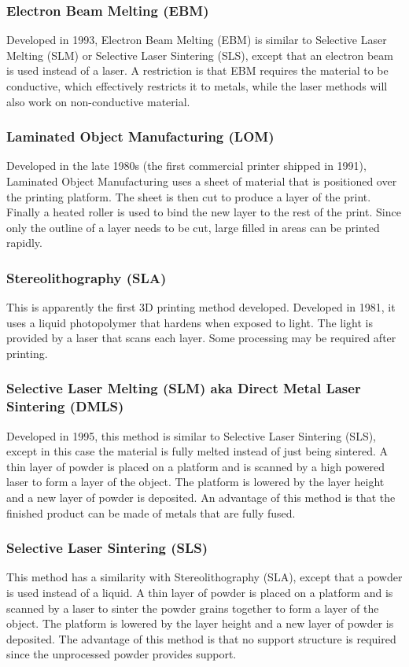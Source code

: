 \documentclass[english,10pt]{beamer}
\begin{document}
\begin{frame}
  \frametitle{Electron Beam Melting (EBM)}
  Developed in 1993, Electron Beam Melting (EBM) is similar to Selective Laser Melting (SLM) or Selective Laser Sintering (SLS), except that an electron beam is used instead of a laser.  A restriction is that EBM requires the material to be conductive, which effectively restricts it to metals, while the laser methods will also work on non-conductive material.
\end{frame}

\begin{frame}
  \frametitle{Laminated Object Manufacturing (LOM)}
  Developed in the late 1980s (the first commercial printer shipped in 1991), Laminated Object Manufacturing uses a sheet of material that is positioned over the printing platform.  The sheet is then cut to produce a layer of the print.  Finally a heated roller is used to bind the new layer to the rest of the print.  Since only the outline of a layer needs to be cut, large filled in areas can be printed rapidly.
\end{frame}

\begin{frame}
  \frametitle{Stereolithography (SLA)}
  This is apparently the first 3D printing method developed.  Developed in 1981, it uses a liquid photopolymer that hardens when exposed to light.  The light is provided by a laser that scans each layer.  Some processing may be required after printing.
\end{frame}

\begin{frame}
  \frametitle{Selective Laser Melting (SLM) aka Direct Metal Laser Sintering (DMLS)}
  Developed in 1995, this method is similar to Selective Laser Sintering (SLS), except in this case the material is fully melted instead of just being sintered.    A thin layer of powder is placed on a platform and is scanned by a high powered laser to form a layer of the object.  The platform is lowered by the layer height and a new layer of powder is deposited.  An advantage of this method is that the finished product can be made of metals that are fully fused.
\end{frame}

\begin{frame}
  \frametitle{Selective Laser Sintering (SLS)}
  This method has a similarity with Stereolithography (SLA), except that a powder is used instead of a liquid.  A thin layer of powder is placed on a platform and is scanned by a laser to sinter the powder grains together to form a layer of the object.  The platform is lowered by the layer height and a new layer of powder is deposited.  The advantage of this method is that no support structure is required since the unprocessed powder provides support.
\end{frame}
\end{document}
